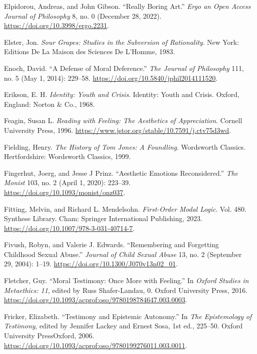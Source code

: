 \documentclass[phdthesis,12pt,final]{wuthesis}
\newlength{\cslhangindent}
\newenvironment{CSLReferences}[2] %
{\begin{list}{}{%
	\setlength{\itemindent}{0pt}
	\setlength{\leftmargin}{0pt}
	\setlength{\parsep}{0pt}
	\ifodd #1
	\setlength{\leftmargin}{\cslhangindent}
	\setlength{\itemindent}{-1\cslhangindent}
	\fi
	\setlength{\itemsep}{#2\baselineskip}}}
{\end{list}}
\theoremstyle{definition}
\theoremstyle{definition}
\theoremstyle{definition}
\theoremstyle{definition}
\theoremstyle{remark}
\begin{document}
\begin{CSLReferences}{1}{0}
Elpidorou, Andreas, and John Gibson. {``Really {Boring Art}.''} \emph{Ergo an Open Access Journal of Philosophy} 8, no. 0 (December 28, 2022). \url{https://doi.org/10.3998/ergo.2231}.

Elster, Jon. \emph{Sour {Grapes}: {Studies} in the {Subversion} of {Rationality}}. New York: Editions De La Maison des Sciences De L'Homme, 1983.

Enoch, David. {``A {Defense} of {Moral Deference}.''} \emph{The Journal of Philosophy} 111, no. 5 (May 1, 2014): 229--58. \url{https://doi.org/10.5840/jphil2014111520}.

Erikson, E. H. \emph{Identity: Youth and Crisis}. Identity: Youth and Crisis. Oxford, England: Norton \& Co., 1968.

Feagin, Susan L. \emph{Reading with {Feeling}: {The Aesthetics} of {Appreciation}}. Cornell University Press, 1996. \url{https://www.jstor.org/stable/10.7591/j.ctv75d3wd}.

Fielding, Henry. \emph{The {History} of {Tom Jones}: {A} Foundling}. Wordsworth {Classics}. Hertfordshire: Wordsworth Classics, 1999.

Fingerhut, Joerg, and Jesse J Prinz. {``Aesthetic Emotions Reconsidered.''} \emph{The Monist} 103, no. 2 (April 1, 2020): 223--39. \url{https://doi.org/10.1093/monist/onz037}.

Fitting, Melvin, and Richard L. Mendelsohn. \emph{First-{Order Modal Logic}}. Vol. 480. Synthese {Library}. Cham: Springer International Publishing, 2023. \url{https://doi.org/10.1007/978-3-031-40714-7}.

Fivush, Robyn, and Valerie J. Edwards. {``Remembering and {Forgetting Childhood Sexual Abuse}.''} \emph{Journal of Child Sexual Abuse} 13, no. 2 (September 29, 2004): 1--19. \url{https://doi.org/10.1300/J070v13n02_01}.

Fletcher, Guy. {``Moral {Testimony}: {Once More} with {Feeling}.''} In \emph{Oxford {Studies} in {Metaethics}: 11}, edited by Russ Shafer-Landau, 0. Oxford University Press, 2016. \url{https://doi.org/10.1093/acprof:oso/9780198784647.003.0003}.

Fricker, Elizabeth. {``Testimony and {Epistemic Autonomy}.''} In \emph{The {Epistemology} of {Testimony}}, edited by Jennifer Lackey and Ernest Sosa, 1st ed., 225--50. Oxford University PressOxford, 2006. \url{https://doi.org/10.1093/acprof:oso/9780199276011.003.0011}.


\end{CSLReferences}
\end{document}
